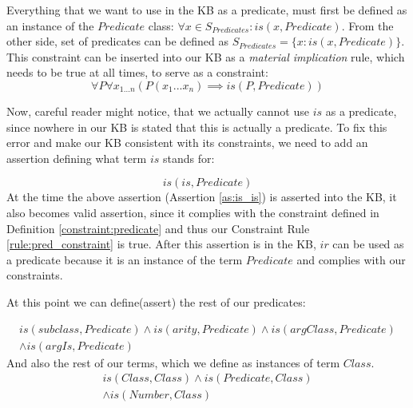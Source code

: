 \begin{definition}\label{constraint:predicate}
Everything that we want to use in the KB as a predicate, must first be defined
as an instance of the $Predicate$ class:
$\forall x \in S_{Predicates}: is(x,Predicate)$. From the other side, set of
predicates can be defined as $S_{Predicates}=\{x:is(x,Predicate)\}$.
This constraint can be inserted into our KB as a \emph{material implication}
rule, which needs to be true at all times, to serve as a constraint:
\begin{equation}\label{rule:pred_constraint}
\forall P \forall x_{1...n} (P(x_1...x_n) \implies is(P,Predicate))
\end{equation}
\end{definition}

Now, careful reader might notice, that we actually cannot use $is$ as a 
predicate, since nowhere in our KB is stated that this is actually a 
predicate. To fix this error and make our KB consistent with its constraints,
we need to add an assertion defining what term $is$ stands for:

\begin{equation}\label{as:is_is}
is(is, Predicate)
\end{equation}
At the time the above assertion (Assertion \ref{as:is_is}) is asserted
into the KB, it also becomes valid assertion, since it complies with the
constraint defined in Definition \ref{constraint:predicate} and thus our
Constraint Rule \ref{rule:pred_constraint} is true. After this 
assertion is in the KB, $ir$ can be used as a predicate because it is an 
instance of the term $Predicate$ and complies with our constraints. 

At this point we can define(assert) the rest of our predicates:

\begin{equation}\label{as:predicates}
\begin{gathered}
is(subclass, Predicate) \land is(arity,Predicate) \land is(argClass,Predicate)\\
\land is(argIs,Predicate)
\end {gathered}
\end{equation}
And also the rest of our terms, which we define as instances of term $Class$.
\begin{equation}\label{as:is_class}
\begin{gathered}
	is(Class,Class) \land is(Predicate,Class)\\ 
\land is(Number, Class)
\end {gathered}
\end{equation}

